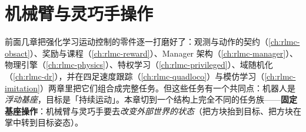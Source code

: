 \chapter{机械臂与灵巧手操作}\label{ch:rlmc-manip}


前面几章把强化学习运动控制的零件逐一打磨好了：观测与动作的契约（\cref{ch:rlmc-obsact}）、奖励与课程（\cref{ch:rlmc-reward}）、Manager 架构（\cref{ch:rlmc-manager}）、物理引擎（\cref{ch:rlmc-physics}）、特权学习（\cref{ch:rlmc-privileged}）、域随机化（\cref{ch:rlmc-dr}），并在四足速度跟踪（\cref{ch:rlmc-quadloco}）与模仿学习（\cref{ch:rlmc-imitation}）两章里把它们组合成完整任务。但这些任务有一个共同点：机器人是\emph{浮动基座}，目标是「持续运动」。本章切到一个结构上完全不同的任务族——\textbf{固定基座操作}：机械臂与灵巧手要去\emph{改变外部世界的状态}（把方块抬到目标、把方块在掌中转到目标姿态）。

